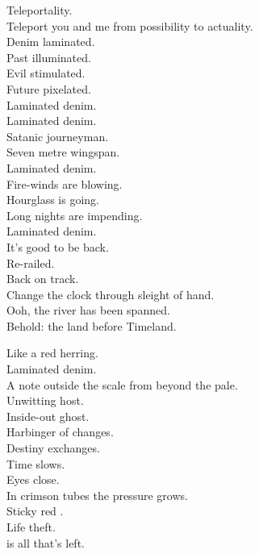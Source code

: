 Teleportality. \\
Teleport you and me from possibility to actuality. \\
Denim laminated. \\
Past illuminated. \\
Evil stimulated. \\
Future pixelated. \\

Laminated denim. \\

Laminated denim. \\
Satanic journeyman. \\
Seven metre wingspan. \\
Laminated denim. \\
Fire-winds are blowing. \\
Hourglass is going. \\
Long nights are impending. \\
Laminated denim. \\

It's good to be back. \\
Re-railed. \\
Back on track. \\
Change the clock through sleight of hand. \\
Ooh, the river has been spanned. \\
Behold: the land before Timeland. \\




Like a red herring. \\
Laminated denim. \\
A note outside the scale from beyond the pale. \\
Unwitting host. \\
Inside-out ghost. \\
Harbinger of changes. \\
Destiny exchanges. \\
Time slows. \\
Eyes close. \\
In crimson tubes the pressure grows. \\
Sticky red . \\
Life theft. \\
 is all that's left. \\

